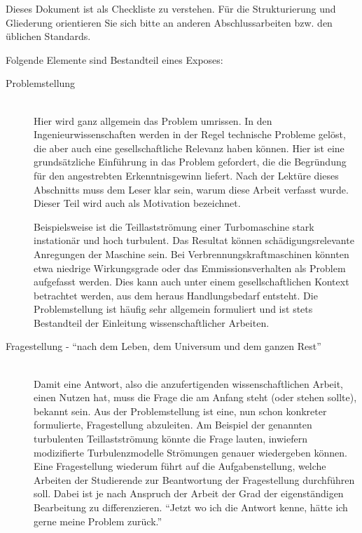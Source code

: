 \documentclass[a4paper,11pt,twoside,final]{scrreprt}
\begin{document}
Dieses Dokument ist als Checkliste zu verstehen. Für die Strukturierung und Gliederung orientieren Sie sich 
bitte an anderen Abschlussarbeiten bzw. den üblichen Standards.

Folgende Elemente sind Bestandteil eines Exposes:

	\begin{description}
		\item[Problemstellung] \hfill \\  
		Hier wird ganz allgemein das Problem umrissen. In den Ingenieurwissenschaften werden in der Regel 
		technische Probleme gelöst, die aber auch eine gesellschaftliche Relevanz haben können. 
		Hier ist eine grundsätzliche Einführung in das Problem gefordert, die die Begründung für den 
		angestrebten Erkenntnisgewinn liefert.  Nach der Lektüre dieses Abschnitts muss dem Leser klar sein, 
		warum diese Arbeit verfasst wurde. Dieser Teil wird auch als Motivation bezeichnet.
		
		Beispielsweise ist die Teillastströmung einer Turbomaschine stark instationär und hoch turbulent.
		Das Resultat können schädigungsrelevante Anregungen der Maschine sein. Bei Verbrennungskraftmaschinen
		könnten etwa niedrige Wirkungsgrade oder das Emmissionsverhalten als Problem aufgefasst werden.
		Dies kann auch unter einem gesellschaftlichen Kontext betrachtet werden, aus dem heraus Handlungsbedarf 
		entsteht.
		Die Problemstellung ist häufig
		sehr allgemein formuliert und ist stets Bestandteil der Einleitung wissenschaftlicher Arbeiten.
	
		
		\item[Fragestellung - \textquotedblleft nach dem Leben, dem Universum und dem ganzen Rest\textquotedblright] \hfill \\ 
		 Damit eine Antwort, also die anzufertigenden wissenschaftlichen Arbeit, einen Nutzen hat, muss die 
		 Frage die am Anfang steht (oder stehen sollte), bekannt sein. 
		 Aus der Problemstellung ist eine, nun schon konkreter formulierte, Fragestellung abzuleiten.
		 Am Beispiel der genannten turbulenten Teillastströmung könnte die Frage lauten, inwiefern modizifierte  
		 Turbulenzmodelle Strömungen genauer wiedergeben können.
		 Eine Fragestellung wiederum führt auf die Aufgabenstellung, welche Arbeiten der Studierende 
		 zur Beantwortung der Fragestellung durchführen soll. Dabei ist je nach Anspruch der Arbeit der
		 Grad der eigenständigen Bearbeitung zu differenzieren.
		 \textquotedblleft Jetzt wo ich die Antwort kenne, hätte ich gerne meine Problem zurück.\textquotedblright
		 

\end{description}
\end{document}
